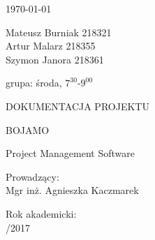 \documentclass[12pt]{article}
\begin{document}
\thispagestyle{empty}

\begin{flushright}\today\end{flushright}

\noindent
Mateusz Burniak 218321 \\
Artur Malarz 218355 \\
Szymon Janora 218361 \\

\vspace{1em}

\noindent
grupa: środa, $7^{30}$-$9^{00}$

\vfill

\begin{center}
  \begin{Large}
DOKUMENTACJA PROJEKTU
  \end{Large}

\vspace{2cm}
 

  \begin{Huge}
BOJAMO 

  \end{Huge}
  
 \vspace{1cm}
  
  \begin{Large}

Project Management Software

  \end{Large}
\end{center}

\vspace{3cm}
 
\noindent
  \begin{Large}
    Prowadzący: \\
      \vspace{.5cm}
\indent
Mgr inż. Agnieszka Kaczmarek
  \end{Large}


  \vspace{1cm}
  
\noindent
  \begin{Large}
    Rok akademicki: \\
      \vspace{.5cm}
/2017
  \end{Large}
  

\vfill

\newpage

\tableofcontents
\end{document}
